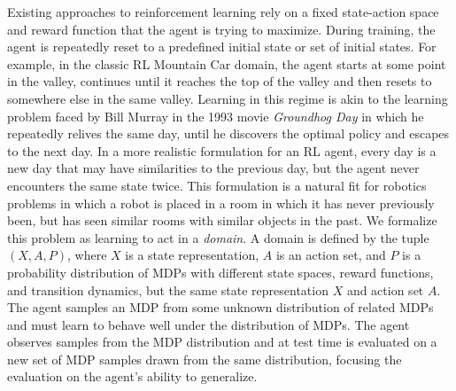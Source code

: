 Existing approaches to reinforcement learning rely on a fixed
state-action space and reward function that the agent is trying to
maximize.  During training, the agent is repeatedly reset to a
predefined initial state or set of initial states.  For example, in
the classic RL Mountain Car domain, the agent starts at some point in
the valley, continues until it reaches the top of the valley and then
resets to somewhere else in the same valley. Learning in this regime
is akin to the learning problem faced by Bill Murray in the 1993 movie
{\em Groundhog Day} in which he repeatedly relives the same day, until
he discovers the optimal policy and escapes to the next day.  In a
more realistic formulation for an RL agent, every day is a new day
that may have similarities to the previous day, but the agent never
encounters the same state twice.  This formulation is a natural fit
for robotics problems in which a robot is placed in a room in which it
has never previously been, but has seen similar rooms with similar
objects in the past.  We formalize this problem as learning to act in
a {\em domain}. A domain is defined by the tuple $(X, A, P)$, where
$X$ is a state representation, $A$ is an action set, and $P$ is a
probability distribution of MDPs with different state spaces, reward
functions, and transition dynamics, but the same state representation
$X$ and action set $A$. The agent samples an MDP from some unknown
distribution of related MDPs and must learn to behave well under the
distribution of MDPs. The agent observes samples from the MDP
distribution and at test time is evaluated on a new set of MDP samples
drawn from the same distribution, focusing the evaluation on the
agent's ability to generalize.

